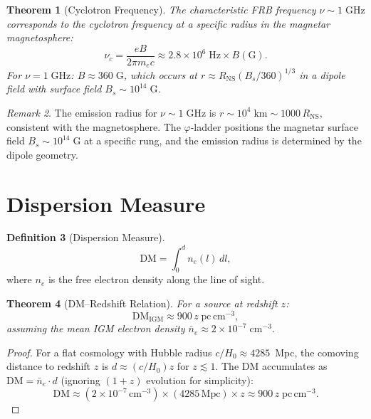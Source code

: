 \documentclass[12pt,a4paper]{article}
\newtheorem{theorem}{Theorem}[section]
\theoremstyle{definition}
\newtheorem{definition}[theorem]{Definition}
\theoremstyle{remark}
\newtheorem{remark}[theorem]{Remark}
\begin{document}
\begin{theorem}[Cyclotron Frequency]
The characteristic FRB frequency $\nu \sim 1\;\mathrm{GHz}$
corresponds to the cyclotron frequency at a specific radius in the
magnetar magnetosphere:
\begin{equation}
  \nu_c = \frac{eB}{2\pi m_e c} \approx 2.8 \times
  10^6\;\mathrm{Hz} \times B(\mathrm{G}).
\end{equation}
For $\nu = 1\;\mathrm{GHz}$: $B \approx 360\;\mathrm{G}$, which
occurs at $r \approx R_{\mathrm{NS}} (B_s/360)^{1/3}$ in a dipole
field with surface field $B_s \sim 10^{14}\;\mathrm{G}$.
\end{theorem}

\begin{remark}
The emission radius for $\nu \sim 1\;\mathrm{GHz}$ is
$r \sim 10^4\;\mathrm{km} \sim 1000\,R_{\mathrm{NS}}$,
consistent with the magnetosphere.  The $\varphi$-ladder positions
the magnetar surface field $B_s \sim 10^{14}\;\mathrm{G}$ at a
specific rung, and the emission radius is determined by the dipole
geometry.
\end{remark}

\section{Dispersion Measure}
\label{sec:dm}

\begin{definition}[Dispersion Measure]
\begin{equation}
  \mathrm{DM} = \int_0^d n_e(l)\,dl,
\end{equation}
where $n_e$ is the free electron density along the line of sight.
\end{definition}

\begin{theorem}[DM--Redshift Relation]
For a source at redshift $z$:
\begin{equation}
  \mathrm{DM}_{\mathrm{IGM}} \approx 900\,z\;
  \mathrm{pc\,cm^{-3}},
\end{equation}
assuming the mean IGM electron density
$\bar{n}_e \approx 2 \times 10^{-7}\;\mathrm{cm^{-3}}$.
\end{theorem}

\begin{proof}
For a flat cosmology with Hubble radius $c/H_0 \approx 4285$~Mpc, the
comoving distance to redshift $z$ is $d \approx (c/H_0)z$ for $z \lesssim 1$.
The DM accumulates as $\mathrm{DM} = \bar{n}_e \cdot d$ (ignoring
$(1+z)$ evolution for simplicity):
\[
  \mathrm{DM} \approx (2 \times 10^{-7}\,\mathrm{cm}^{-3})
  \times (4285\,\mathrm{Mpc}) \times z
  \approx 900\,z\;\mathrm{pc\,cm}^{-3}.
\]
\end{proof}
\end{document}
